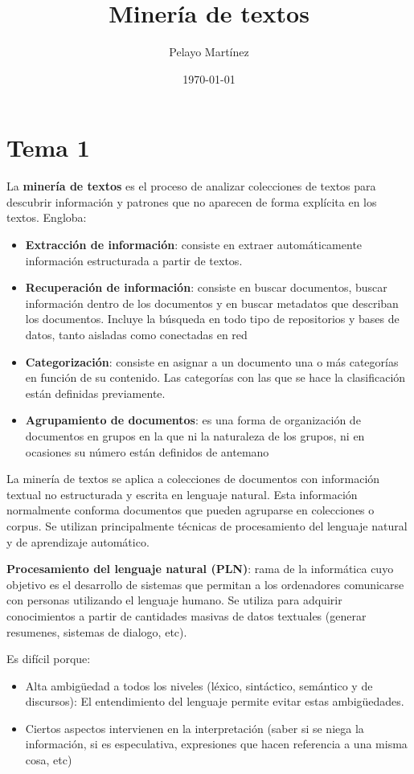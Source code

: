 \documentclass{ctexart}
\title{Minería de textos} %
\author{Pelayo Martínez} %
\date{\today} %
\begin{document}

	\maketitle %
    
	\section{Tema 1}
    La \textbf{minería de textos} es el proceso de analizar colecciones de textos para descubrir información y patrones que no aparecen de forma explícita en los textos.
    Engloba: 
\begin{itemize}
\item   \textbf{Extracción de información}: consiste en extraer automáticamente información estructurada a partir de textos.
\item   \textbf{Recuperación de información}: consiste en buscar documentos, buscar información dentro de los documentos y en buscar metadatos que describan los documentos. Incluye la búsqueda en todo tipo de repositorios y bases de datos, tanto aisladas como conectadas en red
\item   \textbf{Categorización}: consiste en asignar a un documento una o más categorías en función de su contenido. Las categorías con las que se hace la clasificación están definidas previamente.
\item   \textbf{Agrupamiento de documentos}: es una forma de organización de documentos en grupos en la que ni la naturaleza de los grupos, ni en ocasiones su número están definidos de antemano
\end{itemize}
    
 \begin{flushleft}
La minería de textos se aplica a colecciones de documentos con información textual no estructurada y escrita en lenguaje natural. Esta información normalmente conforma documentos que pueden agruparse en colecciones o corpus.  Se utilizan principalmente técnicas de procesamiento del lenguaje natural y de aprendizaje automático.
\end{flushleft}
\begin{flushleft}
\textbf{Procesamiento del lenguaje natural (PLN)}: rama de la informática cuyo objetivo es el desarrollo de sistemas que permitan a los ordenadores comunicarse con personas utilizando el lenguaje humano. Se utiliza para adquirir conocimientos a partir de cantidades masivas de datos textuales (generar resumenes, sistemas de dialogo, etc). 
\end{flushleft}
Es difícil porque:

\begin{itemize}
\item Alta ambigüedad a todos los niveles (léxico, sintáctico, semántico y de discursos): El entendimiento del lenguaje permite evitar estas ambigüedades.
\item Ciertos aspectos intervienen en la interpretación (saber si se niega la información, si es especulativa, expresiones que hacen referencia a una misma cosa, etc)
\end{itemize}
\end{document}
